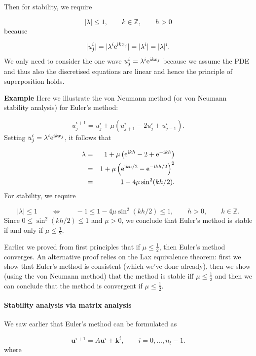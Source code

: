 \documentclass[12pt,a4paper]{article}
\begin{document}
Then for stability, we require

\[
\vert \lambda \vert \leq 1, \qquad  k \in \mathbb{Z}, \qquad h > 0
\]
because

\[
\vert u^i_j \vert = \vert \lambda^i {\rm e}^{{\rm i}k x_j} \vert = \vert \lambda^i \vert = \vert \lambda \vert^i.
\]
We only need to consider the one wave $u^i_j = \lambda^i {\rm e}^{{\rm i}k x_j}$ because we assume the PDE and thus also the discretised equations are linear and hence the principle of superposition holds. 

\textbf{Example} Here we illustrate the von Neumann method (or von Neumann stability analysis) for Euler's method:

\[
u^{i+1}_j = u^i_j + \mu \left( u^{i}_{j+1} - 2u^i_j + u^i_{j-1}  \right).
\]
Setting $u^i_j = \lambda^i {\rm e}^{{\rm i}k x_j}$, it follows that


\begin{eqnarray*}
\lambda &=& 1 + \mu\left({\rm e}^{{\rm i}kh} - 2 +  {\rm e}^{-{\rm i}kh}  \right)  \\
&=& 1 + \mu\left({\rm e}^{{\rm i}kh/2}  -  {\rm e}^{-{\rm i}kh/2}  \right)^2  \\
&=& 1 - 4\mu \sin^2(kh/2).
\end{eqnarray*}
For stability, we require

\[
\vert \lambda \vert \leq 1 \qquad \Leftrightarrow \qquad  -1 \leq  1 - 4\mu \sin^2(kh/2) \leq 1, \qquad h>0, \qquad k \in \mathbb{Z}.
\]
Since $0 \leq \sin^2(kh/2) \leq 1$ and $\mu > 0$, we conclude that Euler's method is stable if and only if $\mu \leq \frac{1}{2}$.

Earlier we proved from first principles that if $\mu \leq \frac{1}{2}$, then Euler's method converges. An alternative proof relies on the Lax equivalence theorem: first we show that Euler's method is consistent (which we've done already), then we show (using the von Neumann method) that the method is stable iff $\mu \leq \frac{1}{2}$ and then we can conclude that the method is convergent if $\mu \leq \frac{1}{2}$.

\paragraph{Stability analysis via matrix analysis}
We saw earlier that Euler's method can be formulated as

\[
\mathbf{u}^{i+1} = A\mathbf{u}^i + \mathbf{k}^i, \qquad i = 0, \ldots, n_t-1.
\]
where
\end{document}
